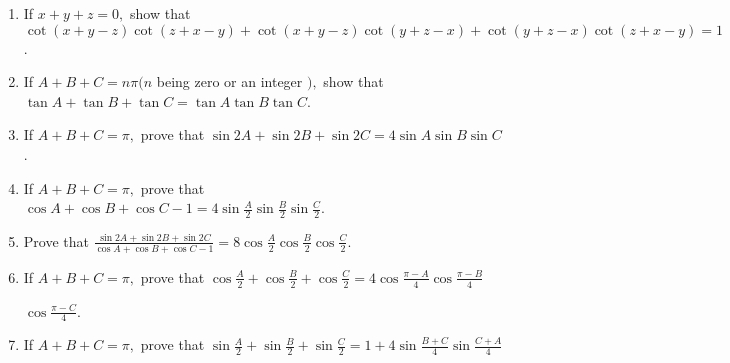\begin{enumerate}
\item If $x + y + z = 0,$ show that $\cot(x + y - z)\cot(z + x - y) + \cot(x + y - z)\cot(y + z - x) + \cot(y + z -
  x)\cot(z + x - y) = 1$.
\item If $A + B + C = n\pi(n$ being zero or an integer $),$ show that $\tan A + \tan B + \tan C = \tan A\tan B\tan
  C$.
\item If $A + B + C = \pi,$ prove that $\sin 2A + \sin 2B + \sin 2C = 4\sin A\sin B\sin C$.
\item If $A + B + C = \pi,$ prove that $\cos A + \cos B + \cos C - 1 = 4\sin \frac{A}{2}\sin \frac{B}{2}\sin \frac{C}{2}$.
\item Prove that $\frac{\sin 2A + \sin 2B + \sin 2C}{\cos A + \cos B + \cos C - 1} =
  8\cos\frac{A}{2}\cos\frac{B}{2}\cos\frac{C}{2}$.
\item If $A + B + C = \pi,$ prove that $\cos\frac{A}{2} + \cos\frac{B}{2} + \cos\frac{C}{2} = 4\cos\frac{\pi -
  A}{4}\cos\frac{\pi - B}{4}$

  $\cos\frac{\pi - C}{4}$.
\item If $A + B + C = \pi,$ prove that $\sin \frac{A}{2} + \sin \frac{B}{2} + \sin \frac{C}{2} = 1 + 4\sin \frac{B +
  C}{4}\sin \frac{C + A}{4}$


\end{enumerate}
